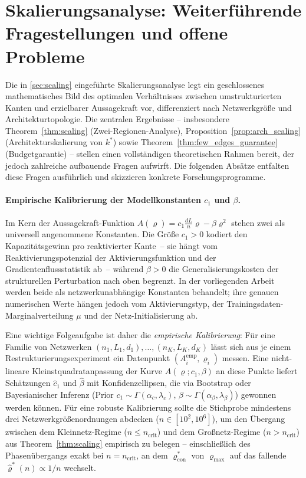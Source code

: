 ﻿\documentclass[12pt, a4paper, openany]{report}
\begin{document}
\section{Skalierungsanalyse: Weiterführende Fragestellungen und offene Probleme}
\label{sec:outlook_scaling}

Die in \cref{sec:scaling} eingeführte Skalierungsanalyse legt ein geschlossenes
mathematisches Bild des optimalen Verhältnisses zwischen umstrukturierten
Kanten und erzielbarer Aussagekraft vor, differenziert nach Netzwerkgröße und
Architekturtopologie.  Die zentralen Ergebnisse -- insbesondere
Theorem~\ref{thm:scaling} (Zwei-Regionen-Analyse), Proposition~\ref{prop:arch_scaling}
(Architekturskalierung von $k^*$) sowie Theorem~\ref{thm:few_edges_guarantee}
(Budgetgarantie) -- stellen einen vollständigen theoretischen Rahmen bereit,
der jedoch zahlreiche auf\-bau\-ende Fragen aufwirft.  Die folgenden Absätze
entfalten diese Fragen ausführlich und skizzieren konkrete Forschungsprogramme.

\paragraph{Empirische Kalibrierung der Modellkonstanten $c_1$ und $\beta$.}
Im Kern der Aussage\-kraft-Funktion $A(\varrho) = c_1 \frac{dL}{n}\varrho - \beta\varrho^2$
stehen zwei als universell angenommene Konstanten.  Die Größe $c_1 > 0$
kodiert den Kapazitätsgewinn pro reaktivierter Kante~-- sie hängt vom
Reaktivierungspotenzial der Aktivierungsfunktion und der Gradientenfluss\-statistik
ab~-- während $\beta > 0$ die Generalisierungskosten der strukturellen
Perturbation nach oben begrenzt.  In der vorliegenden Arbeit werden beide
als netzwerkunabhängige Konstanten behandelt; ihre genauen numerischen Werte
hängen jedoch vom Aktivierungstyp, der Trainingsdaten-Marginalverteilung
$\mu$ und der Netz-Initialisierung ab.

Eine wichtige Folgeaufgabe ist daher die \emph{empirische Kalibrierung}:
Für eine Familie von Netzwerken $(n_1, L_1, d_1),\ldots,(n_K, L_K, d_K)$
lässt sich aus je einem Restrukturierungsexperiment ein Datenpunkt
$(A_i^{\mathrm{emp}}, \varrho_i)$ messen.  Eine nicht-lineare Kleinstquadrat\-anpassung
der Kurve $A(\varrho; c_1, \beta)$ an diese Punkte liefert Schätzungen
$\hat{c}_1$ und $\hat\beta$ mit Konfidenzellipsen, die via Bootstrap oder
Bayesianischer Inferenz (Prior $c_1 \sim \Gamma(\alpha_c, \lambda_c)$,
$\beta \sim \Gamma(\alpha_\beta, \lambda_\beta)$) gewonnen werden können.
Für eine robuste Kalibrierung sollte die Stichprobe mindestens drei
Netzwerkgrößen\-ordnungen abdecken ($n \in [10^2, 10^6]$), um den Übergang
zwischen dem Kleinnetz-Regime ($n \leq n_{\mathrm{crit}}$) und dem
Großnetz-Regime ($n > n_{\mathrm{crit}}$) aus Theorem~\ref{thm:scaling}
empirisch zu belegen -- einschließlich des Phasenübergangs exakt bei
$n = n_{\mathrm{crit}}$, an dem $\varrho^*_{\mathrm{con}}$ von $\varrho_{\max}$
auf das fallende $\hat\varrho^*(n) \propto 1/n$ wechselt.
\end{document}
